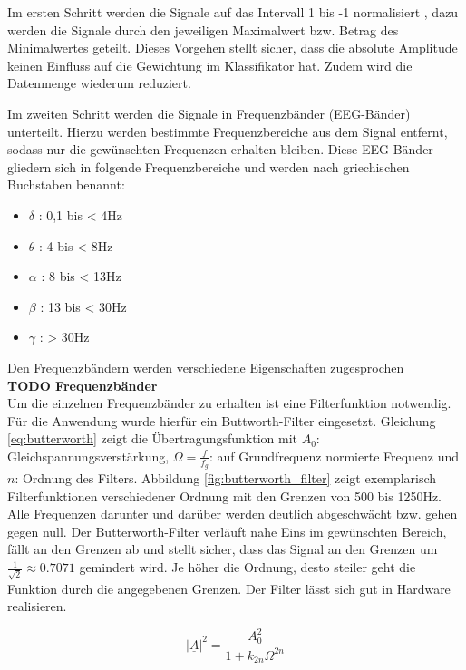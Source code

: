 {Im ersten Schritt werden die Signale auf das Intervall 1 bis -1 normalisiert , dazu werden die Signale durch den jeweiligen Maximalwert bzw. Betrag des Minimalwertes geteilt. Dieses Vorgehen stellt sicher, dass die absolute Amplitude keinen Einfluss auf die Gewichtung im Klassifikator hat. Zudem wird die Datenmenge wiederum reduziert.

Im zweiten Schritt werden die Signale in Frequenzbänder (EEG-Bänder)  unterteilt. Hierzu werden bestimmte Frequenzbereiche aus dem Signal entfernt, sodass nur die gewünschten Frequenzen erhalten bleiben. Diese EEG-Bänder gliedern sich in folgende Frequenzbereiche und werden nach griechischen Buchstaben benannt:
\begin{itemize}
 \item $\delta$ : 0,1 bis < 4Hz
 \item $\theta$ :   4 bis < 8Hz
 \item $\alpha$ :   8 bis < 13Hz
 \item $\beta$  :  13 bis < 30Hz
 \item $\gamma$ :  > 30Hz
\end{itemize}
Den Frequenzbändern werden verschiedene Eigenschaften zugesprochen\\

\textbf{TODO Frequenzbänder}\\

Um die einzelnen Frequenzbänder zu erhalten ist eine Filterfunktion notwendig. Für die Anwendung wurde hierfür ein Buttworth-Filter\cite{Butterworth30} eingesetzt. Gleichung \ref{eq:butterworth} zeigt die Übertragungsfunktion mit $A_0$: Gleichspannungsverstärkung, $\Omega = \frac{f}{f_g}$: auf Grundfrequenz normierte Frequenz und $n$: Ordnung des Filters. Abbildung \ref{fig:butterworth_filter} zeigt exemplarisch Filterfunktionen verschiedener Ordnung mit den Grenzen von 500 bis 1250Hz. Alle Frequenzen darunter und darüber werden deutlich abgeschwächt bzw. gehen gegen null. Der Butterworth-Filter verläuft nahe Eins im gewünschten Bereich, fällt an den Grenzen ab und stellt sicher, dass das Signal an den Grenzen um $\frac{1}{\sqrt{2}} \approx 0.7071$ gemindert wird. Je höher die Ordnung, desto steiler geht die Funktion durch die angegebenen Grenzen. Der Filter lässt sich gut in Hardware realisieren.

\begin{equation} \label{eq:butterworth}
\left|\underline{A}\right|^2 = \frac{A_0^2}{1+ k_{2n} \Omega ^{2n}}
\end{equation}

}
